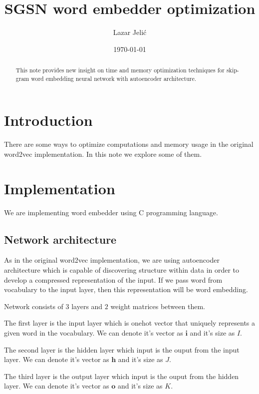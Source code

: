 \documentclass{article}
\title{SGSN word embedder optimization}
\author{Lazar Jelić}
\date{\today}
\begin{document}
\maketitle

\begin{abstract}

This note provides new insight on time and memory optimization techniques for
skip-gram word embedding neural network with autoencoder architecture.

\end{abstract}

\section{Introduction}

There are some ways to optimize computations and memory usage in the
original word2vec implementation. In this note we explore some of them.

\section{Implementation}

We are implementing word embedder using C programming language.

\subsection{Network architecture}

As in the original word2vec implementation, we are using autoencoder
architecture which is capable of discovering structure within data in order
to develop a compressed representation of the input. If we pass word from
vocabulary to the input layer, then this representation will be word embedding.

\medbreak

Network consists of $3$ layers and $2$ weight matrices between them.

The first layer is the input layer which is onehot vector that uniquely represents a given word in the vocabulary.
We can denote it's vector as $\boldsymbol{i}$ and it's size as $I$.

\medbreak

The second layer is the hidden layer which input is the ouput from the input
layer.
We can denote it's vector as $\boldsymbol{h}$ and it's size as $J$.

\medbreak

The third layer is the output layer which input is the ouput from the hidden
layer.
We can denote it's vector as $\boldsymbol{o}$ and it's size as $K$.
\end{document}
